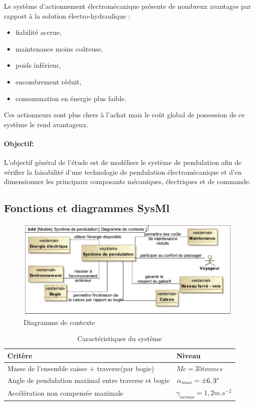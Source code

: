 Le système d'actionnement électromécanique présente de nombreux avantages par rapport à la solution électro-hydraulique :
\begin{itemize}
 \item fiabilité accrue,
 \item maintenance moins coûteuse,
 \item poids inférieur,
 \item encombrement réduit,
 \item consommation en énergie plus faible.
\end{itemize}

Ces actionneurs sont plus chers à l'achat mais le coût global de possession de ce système le rend avantageux.

\paragraph{Objectif:}
L'objectif général de l'étude est de modéliser le système de pendulation afin de vérifier la faisabilité d'une technologie de pendulation électromécanique et d'en dimensionner les principaux composants mécaniques, électriques et de commande.

\subsection{Fonctions et diagrammes SysMl}

\begin{figure}[!h]
 \centering\includegraphics[width=0.9\linewidth]{img/diagramme_contexte}
 \caption{Diagramme de contexte}
 \label{contexte}
\end{figure}

\begin{table}[!h]
\begin{tabular}{|l|l|}
\hline
Critère & Niveau \\
\hline
Masse de l'ensemble caisse + traverse(par bogie) & $Mc=35tonnes$ \\
Angle de pendulation maximal entre traverse et bogie & $\alpha_{max}=\pm6,3\degree$ \\
\hline
Accélération non compensée maximale & $\gamma_{ncmax}=1,2m.s^{-2}$ \\
\hline
\end{tabular}
 \caption{Caractéristiques du système}
 \label{caracteristiques}
\end{table}

